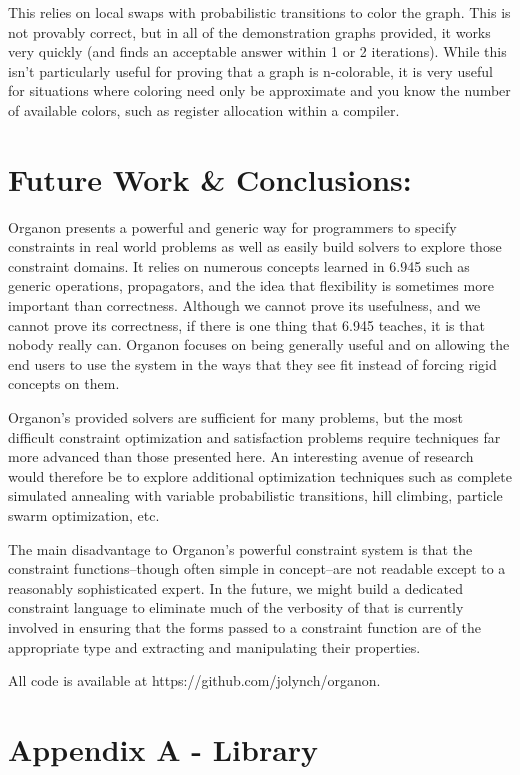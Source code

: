 \documentclass[12pt,a4paper]{article}
\begin{document}
This relies on local swaps with probabilistic transitions to color the graph.  This is not provably correct, but in all of the demonstration graphs provided, it works very quickly (and finds an acceptable answer within 1 or 2 iterations). While this isn't particularly useful for proving that a graph is n-colorable, it is very useful for situations where coloring need only be approximate and you know the number of available colors, such as register allocation within a compiler.

\section{Future Work \& Conclusions:}
Organon presents a powerful and generic way for programmers to specify constraints in real world problems as well as easily build solvers to explore those constraint domains.  It relies on numerous concepts learned in 6.945 such as generic operations, propagators, and the idea that flexibility is sometimes more important than correctness.  Although we cannot prove its usefulness, and we cannot prove its correctness, if there is one thing that 6.945 teaches, it is that nobody really can.  Organon focuses on being generally useful and on allowing the end users to use the system in the ways that they see fit instead of forcing rigid concepts on them.

Organon's provided solvers are sufficient for many problems, but the most difficult constraint optimization and satisfaction problems require techniques far more advanced than those presented here.  An interesting avenue of research would therefore be to explore additional optimization techniques such as complete simulated annealing with variable probabilistic transitions, hill climbing, particle swarm optimization, etc.

The main disadvantage to Organon's powerful constraint system is that the constraint functions--though often simple in concept--are not readable except to a reasonably sophisticated expert. In the future, we might build a dedicated constraint language to eliminate much of the verbosity of that is currently involved in ensuring that the forms passed to a constraint function are of the appropriate type and extracting and manipulating their properties.

All code is available at https://github.com/jolynch/organon.

\appendix
\section{Appendix A - Library}\label{App:AppendixA}
\end{document}
